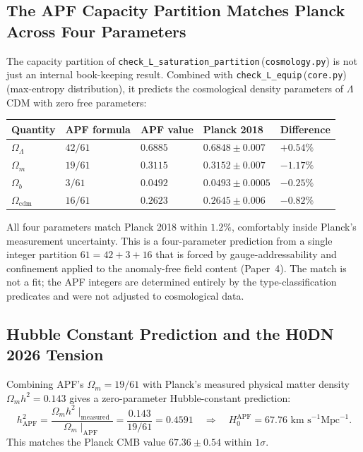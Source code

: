 \documentclass[11pt]{article}
\newcommand{\coderef}[2]{\texttt{#1}\,(\texttt{#2})}
\begin{document}
\subsection{The APF Capacity Partition Matches Planck Across Four Parameters}\label{sec:planck-match}

The capacity partition of \coderef{check\_L\_saturation\_partition}{cosmology.py}
is not just an internal book-keeping result. Combined with
\coderef{check\_L\_equip}{core.py} (max-entropy distribution), it predicts
the cosmological density parameters of $\Lambda$CDM with zero free parameters:

\begin{center}
\begin{tabular}{@{}lllll@{}}
\toprule
Quantity & APF formula & APF value & Planck 2018 & Difference \\
\midrule
$\Omega_\Lambda$ & $42/61$ & $0.6885$ & $0.6848 \pm 0.007$ & $+0.54\%$ \\
$\Omega_m$       & $19/61$ & $0.3115$ & $0.3152 \pm 0.007$ & $-1.17\%$ \\
$\Omega_b$       & $3/61$  & $0.0492$ & $0.0493 \pm 0.0005$ & $-0.25\%$ \\
$\Omega_{\mathrm{cdm}}$ & $16/61$ & $0.2623$ & $0.2645 \pm 0.006$ & $-0.82\%$ \\
\bottomrule
\end{tabular}
\end{center}

All four parameters match Planck 2018 within $1.2\%$, comfortably inside
Planck's measurement uncertainty. This is a four-parameter prediction
from a single integer partition $61 = 42 + 3 + 16$ that is forced by
gauge-addressability and confinement applied to the anomaly-free
field content (Paper~4). The match is not a fit; the APF integers
are determined entirely by the type-classification predicates and
were not adjusted to cosmological data.

\subsection{Hubble Constant Prediction and the H0DN 2026 Tension}\label{sec:H0-status}
Combining APF's $\Omega_m = 19/61$ with Planck's measured physical matter
density $\Omega_m h^2 = 0.143$ gives a zero-parameter Hubble-constant
prediction:
\[
h_{\mathrm{APF}}^2 = \frac{\Omega_m h^2 \mid_{\mathrm{measured}}}
                          {\Omega_m \mid_{\mathrm{APF}}}
                  = \frac{0.143}{19/61} = 0.4591
\quad\Longrightarrow\quad
H_0^{\mathrm{APF}} = 67.76 \text{ km s}^{-1}\text{Mpc}^{-1}.
\]
This matches the Planck CMB value $67.36 \pm 0.54$ within $1\sigma$.
\end{document}

